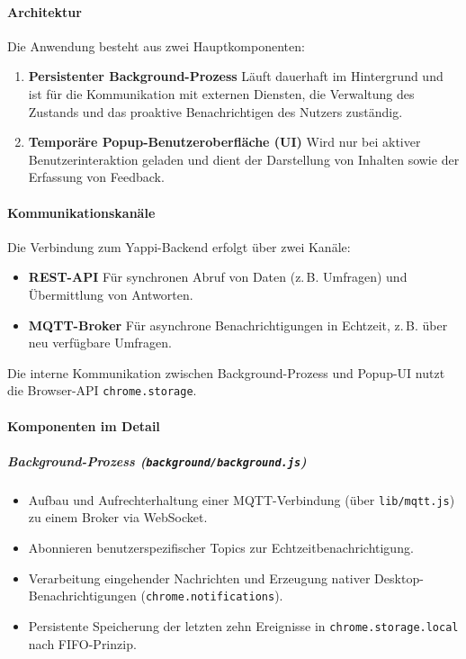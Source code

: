 \documentclass[12pt,a4paper]{report}
\begin{document}
\paragraph{Architektur}
    Die Anwendung besteht aus zwei Hauptkomponenten:
    \begin{enumerate}
      \item \textbf{Persistenter Background-Prozess}
            Läuft dauerhaft im Hintergrund und ist für die Kommunikation mit externen Diensten, die Verwaltung des Zustands
            und das proaktive Benachrichtigen des Nutzers zuständig.
      \item \textbf{Temporäre Popup-Benutzeroberfläche (UI)}
            Wird nur bei aktiver Benutzerinteraktion geladen und dient der Darstellung von Inhalten sowie der Erfassung von Feedback.
    \end{enumerate}


\paragraph{Kommunikationskanäle}
    Die Verbindung zum Yappi-Backend erfolgt über zwei Kanäle:
    \begin{itemize}
      \item \textbf{REST-API} Für synchronen Abruf von Daten (z.\,B. Umfragen) und Übermittlung von Antworten.
      \item \textbf{MQTT-Broker} Für asynchrone Benachrichtigungen in Echtzeit, z.\,B. über neu verfügbare Umfragen.
    \end{itemize}
    Die interne Kommunikation zwischen Background-Prozess und Popup-UI nutzt die Browser-API \texttt{chrome.storage}.

\paragraph{Komponenten im Detail}
    \subparagraph{Background-Prozess (\texttt{background/background.js})}
        \begin{itemize}
          \item Aufbau und Aufrechterhaltung einer MQTT-Verbindung (über \texttt{lib/mqtt.js}) zu einem Broker via WebSocket.
          \item Abonnieren benutzerspezifischer Topics zur Echtzeitbenachrichtigung.
          \item Verarbeitung eingehender Nachrichten und Erzeugung nativer Desktop-Benachrichtigungen (\texttt{chrome.notifications}).
          \item Persistente Speicherung der letzten zehn Ereignisse in \texttt{chrome.storage.local} nach FIFO-Prinzip.
        \end{itemize}
\end{document}
